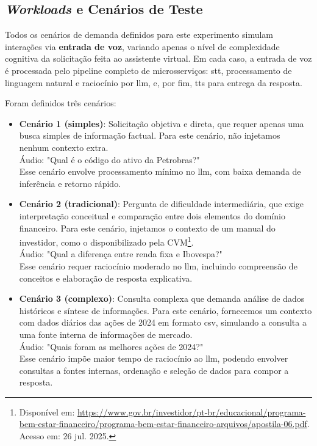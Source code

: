 \subsection{\textit{Workloads} e Cenários de Teste}

Todos os cenários de demanda definidos para este experimento simulam interações via \textbf{entrada de voz}, variando apenas o nível de complexidade cognitiva da solicitação feita ao assistente virtual. Em cada caso, a entrada de voz é processada pelo pipeline completo de microsserviços: \acrfull{stt}, processamento de linguagem natural e raciocínio por \acrfull{llm}, e, por fim,  \acrfull{tts} para entrega da resposta.

Foram definidos três cenários:

\begin{itemize}
    \item \textbf{Cenário 1 (simples)}: Solicitação objetiva e direta, que requer apenas uma busca simples de informação factual. Para este cenário, não injetamos nenhum contexto extra. \\
    Áudio: "Qual é o código do ativo da Petrobras?" \\
    Esse cenário envolve processamento mínimo no \gls{llm}, com baixa demanda de inferência e retorno rápido.
    \item \textbf{Cenário 2 (tradicional)}: Pergunta de dificuldade intermediária, que exige interpretação conceitual e comparação entre dois elementos do domínio financeiro. Para este cenário, injetamos o contexto de um manual do investidor, como o disponibilizado pela CVM\footnote{Disponível em: \url{https://www.gov.br/investidor/pt-br/educacional/programa-bem-estar-financeiro/programa-bem-estar-financeiro-arquivos/apostila-06.pdf}. Acesso em: 26 jul. 2025.}. \\
    Áudio: "Qual a diferença entre renda fixa e Ibovespa?" \\
    Esse cenário requer raciocínio moderado no \gls{llm}, incluindo compreensão de conceitos e elaboração de resposta explicativa.
    \item \textbf{Cenário 3 (complexo)}: Consulta complexa que demanda análise de dados históricos e síntese de informações. Para este cenário, fornecemos um contexto com dados diários das ações de 2024 em formato \gls{csv}, simulando a consulta a uma fonte interna de informações de mercado. \\
    Áudio: "Quais foram as melhores ações de 2024?" \\
    Esse cenário impõe maior tempo de raciocínio ao \gls{llm}, podendo envolver consultas a fontes internas, ordenação e seleção de dados para compor a resposta.
\end{itemize}

